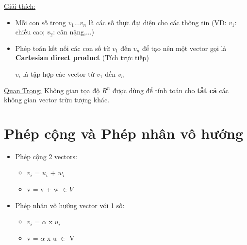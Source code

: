\documentclass{article}
\begin{document}
\underline{Giải thích:}
\begin{itemize}
    \item Mỗi con số trong $v_{1}$...$v_{n}$ là các số thực đại diện cho các thông tin (VD: $v_{1}$: chiều cao; $v_{2}$: cân nặng,...)
    \item Phép toán kết nối các con số từ $v_{1}$ đến $v_{n}$ để tạo nên một vector gọi là \textbf{Cartesian direct product} (Tích trực tiếp)
    \item [$v_{i}$] là tập hợp các vector từ $v_{1}$ đến $v_{n}$
\end{itemize}

\underline{Quan Trọng:} Không gian tọa độ $R^{n}$ được dùng để tính toán cho \textbf{tất cả} các không gian vector trừu tượng khác.

\section{Phép cộng và Phép nhân vô hướng}

\begin{itemize}
    \item Phép cộng 2 vectors: 
    \begin{itemize}
        \item $v_{i}$ = $u_{i}$ + $w_{i}$
        \item v = v + w $\in V$
    \end{itemize}
    
    \item Phép nhân vô hướng vector với 1 số:
    \begin{itemize}
        \item $v_{i}$ = $\alpha $ x $u_{i}$
        \item v = $\alpha$ x u $\in$ V
    \end{itemize}
\end{itemize}
\end{document}
